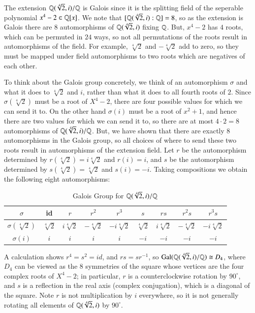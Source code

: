 \documentclass[12pt, a4paper, oneside, openright, titlepage]{book}
\begin{document}
\begin{eg}
    The extension $\mathbb Q(\sqrt[4]{2},i)/\mathbb Q$ is Galois since it is the splitting field of the seperable polynomial $x^4 - 2 \in \mathbb Q[x]$. We note that $[\mathbb Q(\sqrt[4]{2},i):\mathbb Q] = 8$, so as the extension is Galois there are $8$ automorphisms of $\mathbb Q(\sqrt[4]{2},i)$ fixing $\mathbb Q$. But, $x^4-2$ has $4$ roots, which can be permuted in $24$ ways, so not all permutations of the roots result in automorphisms of the field. For example, $\sqrt[4]{2}$ and $-\sqrt[4]{2}$ add to zero, so they must be mapped under field automorphisms to two roots which are negatives of each other. 

    To think about the Galois group concretely, we think of an automorphism $\sigma$ and what it does to $\sqrt[4]{2}$ and $i$, rather than what it does to all fourth roots of $2$. Since $\sigma(\sqrt[4]{2})$ must be a root of $X^4-2$, there are four possible values for which we can send it to. On the other hand $\sigma(i)$ must be a root of $x^2+1$, and hence there are two values for which we can send it to, so there are at most $4\cdot 2 = 8$ automorphisms of $\mathbb Q(\sqrt[4]{2},i)/\mathbb Q$. But, we have shown that there are exactly $8$ automorphisms in the Galois group, so all choices of where to send these two roots result in automorphisms of the extension field. Let $r$ be the automorphism determined by $r(\sqrt[4]{2}) = i\sqrt[4]{2}$ and $r(i) = i$, and $s$ be the automorphism determined by $s(\sqrt[4]{2}) = \sqrt[4]{2}$ and $s(i) = -i$. Taking compositions we obtain the following eight automorphisms:
    \begin{table}[H]
        \centering
        \caption{Galois Group for $\mathbb Q(\sqrt[4]{2},i)/\mathbb Q$}
        \begin{tabular}{c||c|c|c|c|c|c|c|c}
            \hline
            $\sigma$ & id & $r$ & $r^2$ & $r^3$ & $s$ & $rs$ & $r^2s$ & $r^3s$ \\ \hline
            $\sigma(\sqrt[4]{2})$ & $\sqrt[4]{2}$ & $i\sqrt[4]{2}$ & $-\sqrt[4]{2}$ & $-i\sqrt[4]{2}$ & $\sqrt[4]{2}$ & $i\sqrt[4]{2}$ & $-\sqrt[4]{2}$ & $-i\sqrt[4]{2}$ \\ \hline
            $\sigma(i)$ & $i$ & $i$ & $i$ & $i$ & $-i$ & $-i$ & $-i$ & $-i$ \\ \hline
        \end{tabular}
    \end{table}
    A calculation shows $r^4 = s^2 = id$, and $rs= sr^{-1}$, so $\text{Gal}(\mathbb Q(\sqrt[4]{2},i)/\mathbb Q) \cong D_4$, where $D_4$ can be viewed as the $8$ symmetries of the square whose vertices are the four complex roots of $X^4-2$; in particular, $r$ is a counterclockwise rotation by $90^{\circ}$, and $s$ is a reflection in the real axis (complex conjugation), which is a diagonal of the square. Note $r$ is not multiplication by $i$ everywhere, so it is not generally rotating all elements of $\mathbb Q(\sqrt[4]{2},i)$ by $90^{\circ}$. 
\end{eg}
\end{document}
